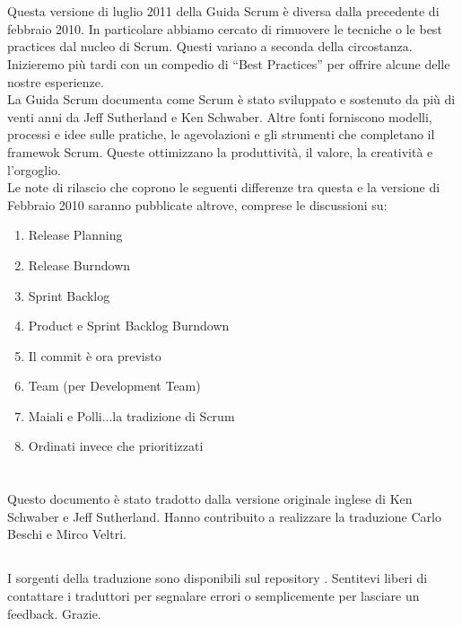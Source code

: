 \newpage
\section*{\color{Blue}{Revisioni}}%
\label{sec:revisions}
Questa versione di luglio 2011 della Guida Scrum è diversa dalla precedente di febbraio 2010. In particolare abbiamo cercato di rimuovere le 
tecniche o le best practices dal nucleo di Scrum. Questi variano a seconda della circostanza. Inizieremo pi\`u tardi con un compedio di 
``Best Practices'' per offrire alcune delle nostre esperienze.
\newline
\\La Guida Scrum documenta come Scrum \`e stato sviluppato e sostenuto da pi\`u di venti anni da Jeff Sutherland e Ken Schwaber. Altre fonti 
forniscono modelli, processi e idee sulle pratiche, le agevolazioni e gli strumenti che completano il framewok Scrum. Queste ottimizzano la 
produttività, il valore, la creatività e l'orgoglio.
\newline
\\Le note di rilascio che coprono le seguenti differenze tra questa e la versione di Febbraio 2010 saranno pubblicate altrove, comprese le 
discussioni su:

\begin{enumerate}
 	\item Release Planning
	\item Release Burndown
	\item Sprint Backlog
	\item Product e Sprint Backlog Burndown
	\item Il commit \`e ora previsto
	\item Team (per Development Team)
	\item Maiali e Polli...la tradizione di Scrum
	\item Ordinati invece che prioritizzati 
\end{enumerate}

\newpage
\section*{\color{Blue}{Traduzione}}%
\label{sec:translation}
Questo documento \`e stato tradotto dalla versione originale inglese di Ken Schwaber e Jeff Sutherland. Hanno contribuito a realizzare la 
traduzione Carlo Beschi e Mirco Veltri.

\subsection*{\color{SteelBlue}{Note alla versione italiana}}%
\label{sec:transnotes}
I sorgenti della traduzione sono disponibili sul repository . 
Sentitevi liberi di contattare i traduttori per segnalare errori o semplicemente per lasciare un feedback. Grazie.

